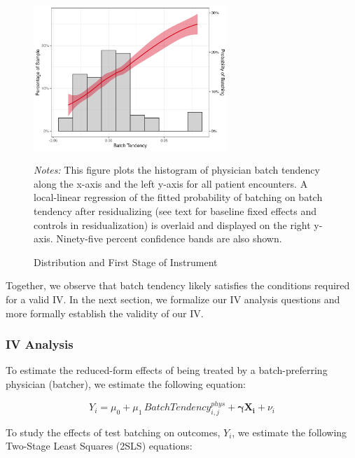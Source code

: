 \documentclass[,,nonblindrev]{informs}
\begin{document}
\begin{figure}[t]
\begin{center}
\caption{Distribution and First Stage of Instrument}
\includegraphics[width=0.65\textwidth]{../outputs/figures/Fig3_firststage.png}
\label{fig:tendency}
\end{center}
\begin{tablenotes}
\item \footnotesize \textit{Notes:} This figure plots the histogram of physician batch tendency along the x-axis and the left y-axis for all patient encounters. A local-linear regression of the fitted probability of batching on batch tendency after residualizing (see text for baseline fixed effects and controls in residualization) is overlaid and displayed on the right y-axis. Ninety-five percent confidence bands are also shown.
\end{tablenotes}
\end{figure}

Together, we observe that batch tendency likely satisfies the conditions
required for a valid IV. In the next section, we formalize our IV
analysis questions and more formally establish the validity of our IV.

\subsubsection{IV Analysis}\label{iv-analysis}

To estimate the reduced-form effects of being treated by a
batch-preferring physician (batcher), we estimate the following
equation:

\begin{equation}
Y_i = \mu_0 + \mu_1 \, BatchTendency_{i,j}^{phys} + \mathbf{\gamma X_i} + \nu_i
\end{equation}

To study the effects of test batching on outcomes, \(Y_i\), we estimate
the following Two-Stage Least Squares (2SLS) equations:
\end{document}
